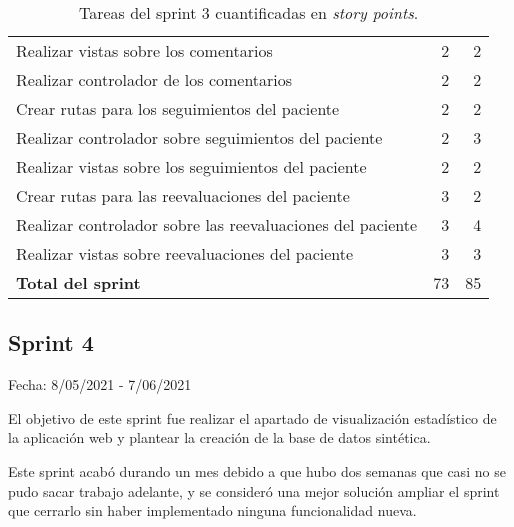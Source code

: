 \begin{table}[H]
\begin{tabularx}{\linewidth}{X r r}
        Realizar vistas sobre los comentarios & 2 & 2 \\
        Realizar controlador de los comentarios & 2 & 2 \\
        Crear rutas para los seguimientos del paciente & 2 & 2 \\
        Realizar controlador sobre seguimientos del paciente & 2 & 3 \\
        Realizar vistas sobre los seguimientos del paciente & 2 & 2 \\
        Crear rutas para las reevaluaciones del paciente & 3 & 2 \\
        Realizar controlador sobre las reevaluaciones del paciente & 3 & 4 \\
        Realizar vistas sobre reevaluaciones del paciente & 3 & 3 \\
        \midrule
	    \textbf{Total del sprint} & 73 & 85 \\
	 	\bottomrule
	 \end{tabularx}
	 \caption{Tareas del sprint 3 cuantificadas en \textit{story points}.}
\end{table}

\subsection{Sprint 4}

Fecha: 8/05/2021 - 7/06/2021

El objetivo de este sprint fue realizar el apartado de visualización estadístico de la aplicación web y plantear la creación de la base de datos sintética.

Este sprint acabó durando un mes debido a que hubo dos semanas que casi no se pudo sacar trabajo adelante, y se consideró una mejor solución ampliar el sprint que cerrarlo sin haber implementado ninguna funcionalidad nueva.


